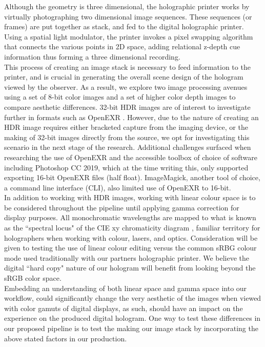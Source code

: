 Although the geometry is three dimensional, the holographic printer works by virtually photographing two dimensional image sequences.  These sequences (or frames) are put together as stack, and fed to the  digital holographic printer.  Using a spatial light modulator, the printer invokes a pixel swapping algorithm that connects the various points in 2D space, adding relational z-depth cue information thus forming a three dimensional recording.\\

This process of creating an image stack is necessary to feed information to the printer, and is crucial in generating the overall scene design of the hologram viewed by the observer. As a result, we explore two image processing avenues using a set of 8-bit color images and a set of higher color depth images to compare aesthetic differences. 32-bit HDR images are of interest to investigate further in formats such as OpenEXR \cite{kainz2009technical}. However, due to the nature of creating an HDR image requires either bracketed capture from the imaging device, or the making of 32-bit images directly from the source, we opt for investigating this scenario in the next stage of the research. Additional challenges surfaced when researching the use of OpenEXR and the accessible toolbox of choice of software including Photoshop CC 2019, which at the time writing this, only supported exporting 16-bit OpenEXR files (half float).  ImageMagick, another tool of choice, a command line interface (CLI), also limited use of OpenEXR to 16-bit.\\

In addition to working with HDR images, working with linear colour space is to be considered throughout the pipeline until applying gamma correction for display purposes.  All monochromatic wavelengths are mapped to what is known as the ``spectral locus" of the CIE xy chromaticity diagram \cite{mansencal_thomas_2018_2647615} \cite{reinhard2010high}, familiar territory for holographers when working with colour, lasers, and optics.  Consideration will be given to testing the use of linear colour editing versus the common sRBG colour mode used traditionally with our partners holographic printer.  We believe the digital ``hard copy" nature of our hologram will benefit from looking beyond the sRGB color space.\\

Embedding an understanding of both linear space and gamma space into our workflow, could significantly change the very aesthetic of the images when viewed with color gamuts of digital displays, as such, should have an impact on the experience on the produced digital hologram.  One way to test these differences in our proposed pipeline is to test the making our image stack by incorporating the above stated factors in our production.